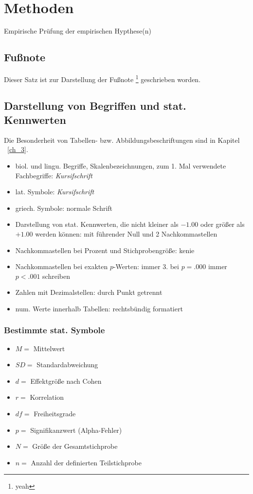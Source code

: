 \chapter{Methoden}   \label{ch_2}
Empirische Prüfung der empirischen Hypthese(n)

\section{Fußnote}
Dieser Satz ist zur Darstellung der Fußnote \footnote{yeah} geschrieben worden.

\section{Darstellung von Begriffen und stat. Kennwerten}
Die Besonderheit von Tabellen- bzw. Abbildungsbeschriftungen sind in Kapitel
~\ref{ch_3}.
\begin{itemize} [leftmargin=1.25cm]
    \item biol. und lingu. Begriffe, Skalenbezeichnungen, zum 1. Mal verwendete
    Fachbegriffe:   \textit{Kursifschrift}
    \item lat. Symbole: \textit{Kursifschrift}
    \item griech. Symbole:  normale Schrift
    \item Darstellung von stat. Kennwerten, die nicht kleiner als $-1.00$ oder größer
    als $+1.00$ werden können:  mit führender Null und 2 Nachkommastellen
    \item Nachkommastellen bei Prozent und Stichprobengröße: kenie
    \item Nachkommastellen bei exakten $p$-Werten:  immer 3. bei $p = .000$ immer
    $p < .001$ schreiben
    \item Zahlen mit Dezimalstellen: durch \glqq Punkt \grqq getrennt
    \item num. Werte innerhalb Tabellen:    rechtsbündig formatiert
\end{itemize}

\subsection{Bestimmte stat. Symbole}
\begin{itemize} [leftmargin=1.25cm]
\item $M =$ Mittelwert
\item $SD =$ Standardabweichung
\item $d =$ Effektgröße nach Cohen
\item $r =$ Korrelation
\item $df =$ Freiheitsgrade
\item $p =$ Signifikanzwert (Alpha-Fehler)
\item $N =$ Größe der Gesamtstichprobe
\item $n =$ Anzahl der definierten Teilstichprobe
\end{itemize}